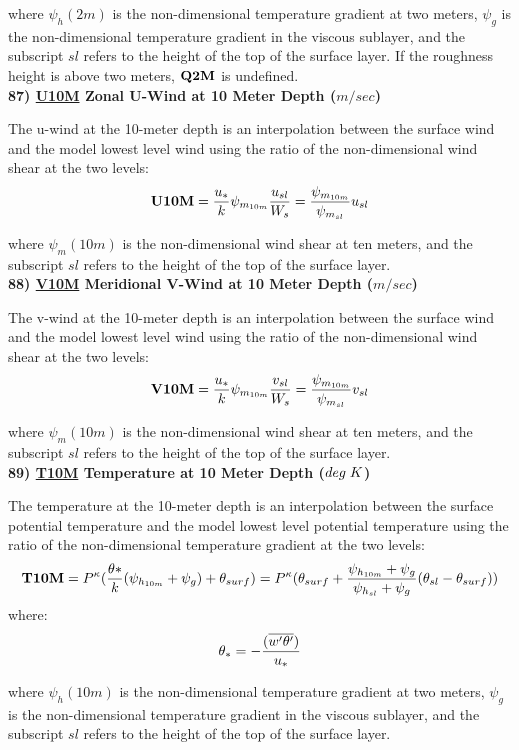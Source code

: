 \noindent
where $\psi_h(2m)$ is the non-dimensional temperature gradient at two meters, $\psi_g$ is
the non-dimensional temperature gradient in the viscous sublayer, and the subscript
$sl$ refers to the height of the top of the surface layer. If the roughness height
is above two meters, ${\bf Q2M}$ is undefined.
\\
 
\noindent
{\bf 87)  \underline {U10M}  Zonal U-Wind at 10 Meter Depth ($m/sec$) }

\noindent
The u-wind at the 10-meter depth is an interpolation between the surface wind
and the model lowest level wind using the ratio of the non-dimensional wind shear
at the two levels:
\[
{\bf U10M} = {u_* \over k} \psi_{m_{10m}} {u_{sl} \over {W_s}} =
{ \psi_{m_{10m}} \over {\psi_{m_{sl}} }}u_{sl}
\]

\noindent
where $\psi_m(10m)$ is the non-dimensional wind shear at ten meters, and the subscript
$sl$ refers to the height of the top of the surface layer.
\\
 
\noindent
{\bf 88)  \underline {V10M}  Meridional V-Wind at 10 Meter Depth ($m/sec$) }

\noindent
The v-wind at the 10-meter depth is an interpolation between the surface wind
and the model lowest level wind using the ratio of the non-dimensional wind shear
at the two levels:
\[
{\bf V10M} = {u_* \over k} \psi_{m_{10m}} {v_{sl} \over {W_s}} =
{ \psi_{m_{10m}} \over {\psi_{m_{sl}} }}v_{sl}
\]

\noindent
where $\psi_m(10m)$ is the non-dimensional wind shear at ten meters, and the subscript
$sl$ refers to the height of the top of the surface layer.
\\
 
\noindent
{\bf 89)  \underline {T10M}  Temperature at 10 Meter Depth ($deg \hspace{.1cm} K$) }

\noindent
The temperature at the 10-meter depth is an interpolation between the surface potential 
temperature and the model lowest level potential temperature using the ratio of the 
non-dimensional temperature gradient at the two levels:
\[
{\bf T10M} = P^{\kappa} ({\theta* \over k} ({\psi_{h_{10m}}+\psi_g}) + \theta_{surf} ) = 
P^{\kappa}(\theta_{surf} + { {\psi_{h_{10m}}+\psi_g} \over {{\psi_{h_{sl}}+\psi_g}} }
(\theta_{sl} - \theta_{surf})) 
\]
where:
\[
\theta_* = - { (\overline{w^{\prime}\theta^{\prime}}) \over {u_*} }
\]

\noindent
where $\psi_h(10m)$ is the non-dimensional temperature gradient at two meters, $\psi_g$ is
the non-dimensional temperature gradient in the viscous sublayer, and the subscript
$sl$ refers to the height of the top of the surface layer.
\\
 
